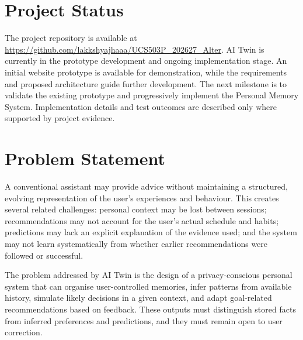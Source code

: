 \documentclass{tietreport}
\begin{document}
\section{Project Status}
The project repository is available at \url{https://github.com/lakkshyajhaaa/UCS503P_202627_Alter}. AI Twin is currently in the prototype development and ongoing implementation stage. An initial website prototype is available for demonstration, while the requirements and proposed architecture guide further development. The next milestone is to validate the existing prototype and progressively implement the Personal Memory System. Implementation details and test outcomes are described only where supported by project evidence.

\clearpage
{}
\section{Problem Statement}
A conventional assistant may provide advice without maintaining a structured, evolving representation of the user's experiences and behaviour. This creates several related challenges: personal context may be lost between sessions; recommendations may not account for the user's actual schedule and habits; predictions may lack an explicit explanation of the evidence used; and the system may not learn systematically from whether earlier recommendations were followed or successful.

The problem addressed by AI Twin is the design of a privacy-conscious personal system that can organise user-controlled memories, infer patterns from available history, simulate likely decisions in a given context, and adapt goal-related recommendations based on feedback. These outputs must distinguish stored facts from inferred preferences and predictions, and they must remain open to user correction.

\end{document}
